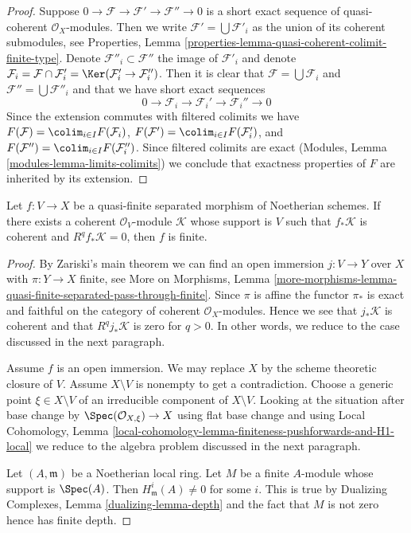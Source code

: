 \begin{proof}
\medskip\noindent
Suppose $0 \to \mathcal{F} \to \mathcal{F}' \to \mathcal{F}'' \to 0$
is a short exact sequence of quasi-coherent $\mathcal{O}_X$-modules.
Then we write $\mathcal{F}' = \bigcup \mathcal{F}'_i$ as the
union of its coherent submodules, see
Properties, Lemma \ref{properties-lemma-quasi-coherent-colimit-finite-type}.
Denote $\mathcal{F}''_i \subset \mathcal{F}''$ the image of $\mathcal{F}'_i$
and denote $\mathcal{F}_i = \mathcal{F} \cap \mathcal{F}'_i =
\Ker(\mathcal{F}'_i \to \mathcal{F}''_i)$. Then it is clear that
$\mathcal{F} = \bigcup \mathcal{F}_i$ and
$\mathcal{F}'' = \bigcup \mathcal{F}''_i$
and that we have short exact sequences
$$
0 \to \mathcal{F}_i \to \mathcal{F}_i' \to \mathcal{F}_i'' \to 0
$$
Since the extension commutes with filtered colimits we have
$F(\mathcal{F}) = \colim_{i \in I} F(\mathcal{F}_i)$,
$F(\mathcal{F}') = \colim_{i \in I} F(\mathcal{F}'_i)$, and
$F(\mathcal{F}'') = \colim_{i \in I} F(\mathcal{F}''_i)$.
Since filtered colimits are exact
(Modules, Lemma \ref{modules-lemma-limits-colimits}) we
conclude that exactness properties of $F$ are inherited by
its extension.
\end{proof}

\begin{lemma}
\label{lemma-characterize-finite}
Let $f : V \to X$ be a quasi-finite separated morphism of Noetherian
schemes. If there exists a coherent $\mathcal{O}_V$-module $\mathcal{K}$
whose support is $V$ such that $f_*\mathcal{K}$ is coherent and
$R^qf_*\mathcal{K} = 0$, then $f$ is finite.
\end{lemma}

\begin{proof}
By Zariski's main theorem we can find an open immersion
$j : V \to Y$ over $X$ with $\pi : Y \to X$ finite, see
More on Morphisms, Lemma
\ref{more-morphisms-lemma-quasi-finite-separated-pass-through-finite}.
Since $\pi$ is affine the functor $\pi_*$ is exact and faithful
on the category of coherent $\mathcal{O}_X$-modules.
Hence we see that $j_*\mathcal{K}$ is coherent and
that $R^qj_*\mathcal{K}$ is zero for $q > 0$.
In other words, we reduce to the case discussed in the next paragraph.

\medskip\noindent
Assume $f$ is an open immersion. We may replace $X$ by the
scheme theoretic closure of $V$. Assume $X \setminus V$ is nonempty
to get a contradiction. Choose a generic point $\xi \in X \setminus V$
of an irreducible component of $X \setminus V$. Looking at the situation
after base change by $\Spec(\mathcal{O}_{X, \xi}) \to X$ using flat base
change and using
Local Cohomology, Lemma
\ref{local-cohomology-lemma-finiteness-pushforwards-and-H1-local}
we reduce to the algebra problem discussed in the next paragraph.

\medskip\noindent
Let $(A, \mathfrak m)$ be a Noetherian local ring. Let $M$ be a finite
$A$-module whose support is $\Spec(A)$. Then $H^i_\mathfrak m(A) \not = 0$
for some $i$. This is true by
Dualizing Complexes, Lemma \ref{dualizing-lemma-depth}
and the fact that $M$ is not zero hence has finite depth.
\end{proof}

